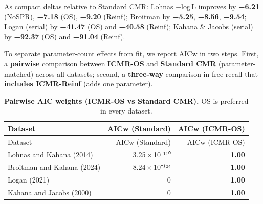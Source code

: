 \documentclass[
  letterpaper,
  11pt,
  english,
  singlespacing,
  headsepline]{MastersDoctoralThesis}
\begin{document}
As compact deltas relative to Standard CMR: Lohnas −log\,L improves by
\textbf{−6.21} (NoSPR), \textbf{−7.18} (OS), \textbf{−9.20} (Reinf);
Broitman by \textbf{−5.25}, \textbf{−8.56}, \textbf{−9.54}; Logan
(serial) by \textbf{−41.47} (OS) and \textbf{−40.58} (Reinf); Kahana \&
Jacobs (serial) by \textbf{−92.37} (OS) and \textbf{−91.04} (Reinf).

To separate parameter-count effects from fit, we report AICw in two
steps. First, a \textbf{pairwise} comparison between \textbf{ICMR-OS}
and \textbf{Standard CMR} (parameter-matched) across all datasets;
second, a \textbf{three-way} comparison in free recall that
\textbf{includes ICMR-Reinf} (adds one parameter).

\begin{longtable}[]{@{}lrr@{}}
\caption{\textbf{Pairwise AIC weights (ICMR-OS vs Standard CMR).} OS is
preferred in every dataset.}\label{tbl-aic-os-vs-cmr}\tabularnewline
\toprule\noalign{}
Dataset & AICw (Standard) & AICw (ICMR-OS) \\
\midrule\noalign{}
\endfirsthead
\toprule\noalign{}
Dataset & AICw (Standard) & AICw (ICMR-OS) \\
\midrule\noalign{}
\endhead
\bottomrule\noalign{}
\endlastfoot
Lohnas and Kahana (2014) & 3.25\,×\,10⁻¹¹⁰ & \textbf{1.00} \\
Broitman and Kahana (2024) & 8.24\,×\,10⁻¹²⁴ & \textbf{1.00} \\
Logan (2021) & 0 & \textbf{1.00} \\
Kahana and Jacobs (2000) & 0 & \textbf{1.00} \\
\end{longtable}
\end{document}
